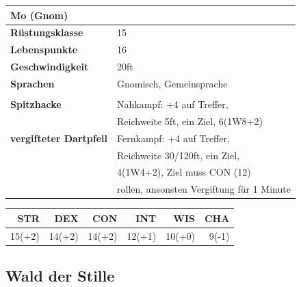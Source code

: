 \documentclass[11pt, twoside]{article}
\begin{document}
\begin{center}
\begin{tabular}{ll}
\textbf{Mo (Gnom)} & \label{table:me1stats}\\[0pt]
\hline
\textbf{Rüstungsklasse} & 15\\[0pt]
\textbf{Lebenspunkte} & 16\\[0pt]
\textbf{Geschwindigkeit} & 20ft\\[0pt]
\textbf{Sprachen} & Gnomisch, Gemeinsprache\\[0pt]
 & \\[0pt]
\textbf{Spitzhacke} & Nahkampf: +4 auf Treffer,\\[0pt]
 & Reichweite 5ft, ein Ziel, 6(1W8+2)\\[0pt]
\textbf{vergifteter Dartpfeil} & Fernkampf: +4 auf Treffer,\\[0pt]
 & Reichweite 30/120ft, ein Ziel,\\[0pt]
 & 4(1W4+2), Ziel muss CON (12)\\[0pt]
 & rollen, ansonsten Vergiftung für 1 Minute\\[0pt]
\end{tabular}
\end{center}

\begin{center}
\begin{tabular}{rrrrrr}
\textbf{STR} & \textbf{DEX} & \textbf{CON} & \textbf{INT} & \textbf{WIS} & \textbf{CHA}\\[0pt]
\hline
15(+2) & 14(+2) & 14(+2) & 12(+1) & 10(+0) & 9(-1)\\[0pt]
\end{tabular}
\end{center}

\newpage

\subsection{Wald der Stille}
\label{sec:org4a704fa}
\end{document}
